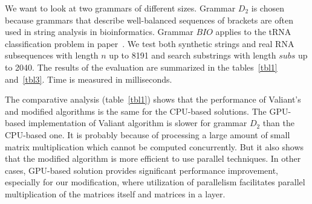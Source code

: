 We want to look at two grammars of different sizes.
Grammar $D_2$ is chosen because grammars that describe well-balanced sequences of brackets are often used in string analysis in bioinformatics. 
Grammar $BIO$ applies to the tRNA classification problem in paper~\cite{bioinformatics19}.
We test both synthetic strings and real RNA subsequences with length $n$ up to 8191 and search substrings with length $subs$ up to 2040. 
The results of the evaluation are summarized in the tables~\ref{tbl1} and~\ref{tbl3}. Time is measured in milliseconds.

\begin{table*}[h]
\caption{Comparison of the Valiant's algorithm and the modification}
\label{tbl1}
\centering
{}
\end{table*}

The comparative analysis (table~\ref{tbl1}) shows that the performance of Valiant's and modified algorithms is the same for the CPU-based solutions.
The GPU-based implementation of Valiant algorithm is slower for grammar $D_2$ than the CPU-based one. 
It is probably because of processing a large amount of small matrix multiplication which cannot be computed concurrently. 
But it also shows that the modified algorithm is more efficient to use parallel techniques.
In other cases, GPU-based solution provides significant performance improvement, especially for our modification, where utilization of parallelism facilitates parallel multiplication of the matrices itself and matrices in a layer.

